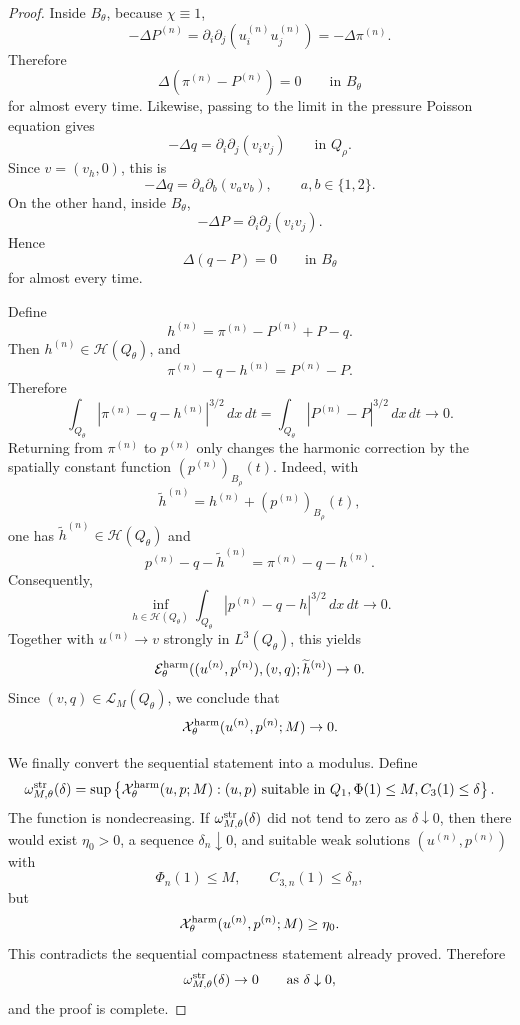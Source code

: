 \documentclass[11pt]{article}
\numberwithin{equation}{section}
\theoremstyle{plain}
\theoremstyle{definition}
\theoremstyle{remark}
\newcommand{\calE}{\mathcal E}
\newcommand{\calH}{\mathcal H}
\newcommand{\calL}{\mathcal L}
\newcommand{\calX}{\mathcal X}
\begin{document}
\begin{proof}
Inside \(B_\theta\), because \(\chi\equiv1\),
\[
        -\Delta P^{(n)}
        =
        \partial_i\partial_j(u^{(n)}_iu^{(n)}_j)
        =
        -\Delta\pi^{(n)} .
\]
Therefore
\[
        \Delta(\pi^{(n)}-P^{(n)})=0
        \qquad\text{in }B_\theta
\]
for almost every time.  Likewise, passing to the limit in the pressure Poisson equation gives
\[
        -\Delta q
        =
        \partial_i\partial_j(v_iv_j)
        \qquad\text{in }Q_\rho .
\]
Since \(v=(v_h,0)\), this is
\[
        -\Delta q
        =
        \partial_a\partial_b(v_av_b),
        \qquad a,b\in\{1,2\}.
\]
On the other hand, inside \(B_\theta\),
\[
        -\Delta P
        =
        \partial_i\partial_j(v_iv_j).
\]
Hence
\[
        \Delta(q-P)=0
        \qquad\text{in }B_\theta
\]
for almost every time.

Define
\[
        h^{(n)}
        =
        \pi^{(n)}-P^{(n)}+P-q .
\]
Then \(h^{(n)}\in\calH(Q_\theta)\), and
\[
        \pi^{(n)}-q-h^{(n)}
        =
        P^{(n)}-P .
\]
Therefore
\[
        \int_{Q_\theta}
        |\pi^{(n)}-q-h^{(n)}|^{3/2}\,dx\,dt
        =
        \int_{Q_\theta}|P^{(n)}-P|^{3/2}\,dx\,dt
        \to0 .
\]
Returning from \(\pi^{(n)}\) to \(p^{(n)}\) only changes the harmonic correction by the spatially constant function \((p^{(n)})_{B_\rho}(t)\).  Indeed, with
\[
        \widetilde h^{(n)}
        =
        h^{(n)}+(p^{(n)})_{B_\rho}(t),
\]
one has \(\widetilde h^{(n)}\in\calH(Q_\theta)\) and
\[
        p^{(n)}-q-\widetilde h^{(n)}
        =
        \pi^{(n)}-q-h^{(n)} .
\]
Consequently,
\[
        \inf_{h\in\calH(Q_\theta)}
        \int_{Q_\theta}|p^{(n)}-q-h|^{3/2}\,dx\,dt
        \to0 .
\]
Together with \(u^{(n)}\to v\) strongly in \(L^3(Q_\theta)\), this yields
\[
        \calE^{\rm harm}_\theta((u^{(n)},p^{(n)}),(v,q);\widetilde h^{(n)})
        \to0 .
\]
Since \((v,q)\in\calL_M(Q_\theta)\), we conclude that
\[
        \calX^{\rm harm}_\theta(u^{(n)},p^{(n)};M)\to0 .
\]

We finally convert the sequential statement into a modulus.  Define
\[
        \omega^{\rm str}_{M,\theta}(\delta)
        =
        \sup
        \left\{
        \calX^{\rm harm}_\theta(u,p;M):
        (u,p)\text{ suitable in }Q_1,
        \Phi(1)\le M,
        C_3(1)\le\delta
        \right\}.
\]
The function is nondecreasing.  If \(\omega^{\rm str}_{M,\theta}(\delta)\) did not tend to zero as \(\delta\downarrow0\), then there would exist \(\eta_0>0\), a sequence \(\delta_n\downarrow0\), and suitable weak solutions \((u^{(n)},p^{(n)})\) with
\[
        \Phi_n(1)\le M,
        \qquad
        C_{3,n}(1)\le\delta_n,
\]
but
\[
        \calX^{\rm harm}_\theta(u^{(n)},p^{(n)};M)\ge\eta_0 .
\]
This contradicts the sequential compactness statement already proved.  Therefore
\[
        \omega^{\rm str}_{M,\theta}(\delta)\to0
        \qquad\text{as }\delta\downarrow0,
\]
and the proof is complete.
\end{proof}
\end{document}
